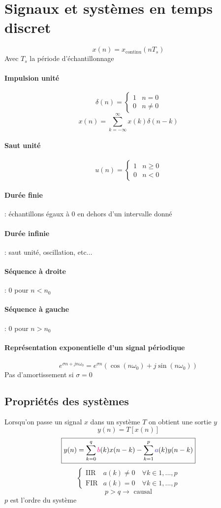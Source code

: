 \documentclass[resume]{subfiles}
\begin{document}
\section{Signaux et systèmes en temps discret}
$$x(n)=x_\text{continu}(nT_s)$$
Avec $T_s$ la période d'échantillonnage
\paragraph{Impulsion unité}
$$\delta(n)=\begin{cases}1 & n=0\\0 & n\neq 0\end{cases}$$
$$x(n)=\sum_{k=-\infty}^{\infty}x(k)\delta(n-k)$$
\paragraph{Saut unité}
$$u(n)=\begin{cases}1 & n \geq 0 \\0 & n < 0\end{cases}$$
\paragraph{Durée finie} : échantillons égaux à 0 en dehors d'un intervalle donné
\paragraph{Durée infinie} : saut unité, oscillation, etc...
\paragraph{Séquence à droite} : $0$ pour $n<n_0$
\paragraph{Séquence à gauche} : $0$ pour $n>n_0$
\paragraph{Représentation exponentielle d'un signal périodique}
$$e^{\sigma n + jn\omega_0}=e^{\sigma n}\left(\cos(n\omega_0)+j\sin(n\omega_0)\right)$$
Pas d'amortissement si $\sigma=0$
\subsection{Propriétés des systèmes}
Lorsqu'on passe un signal $x$ dans un système $T$ on obtient une sortie $y$
$$y(n)=T\left[x(n)\right]$$
$$\boxed{y(n)=\sum_{k=0}^{q}\bcolor{b}(k)x(n-k)-\sum_{k=1}^{p}\acolor{a}(k)y(n-k)}$$
$$\begin{cases}
\text{IIR} & a(k) \neq 0\quad \forall k\in 1,...,p\\
\text{FIR} & a(k) = 0\quad \forall k\in 1,...,p
\end{cases}$$
$$p>q\longrightarrow\text{ causal}$$
$p$ est l'ordre du système
\end{document}
